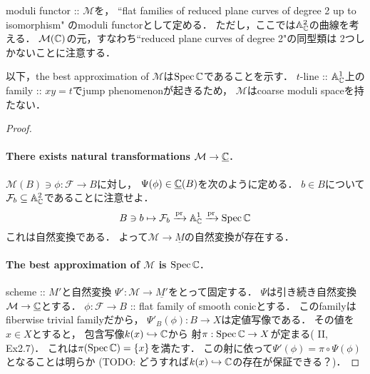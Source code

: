 \documentclass[a4paper]{jsarticle}
\newcommand{\famF}{\mathcal{F}}
\newcommand{\ftor}[1]{\underline{#1}}
\newcommand{\ftorM}{\mathcal{M}}
\begin{document}
    \begin{Example}
        moduli functor :: $\ftorM$を，
        ``flat families of reduced plane curves of degree 2 up to isomorphism"
        のmoduli functorとして定める．
        ただし，ここでは$\mathbb{A}_{\mathbb{C}}^2$の曲線を考える．
        $\ftorM(\C)$の元，すなわち``reduced plane curves of degree 2"の同型類は
        2つしかないことに注意する．

        以下，the best approximation of $\ftorM$は$\operatorname{Spec} \mathbb{C}$であることを示す．
        $t$-line :: $\mathbb{A}_{\mathbb{C}}^1$上のfamily :: $xy=t$でjump phenomenonが起きるため，
        $\ftorM$はcoarse moduli spaceを持たない．

        \begin{proof}
        \paragraph{There exists natural transformations $\ftorM \to \ftor{\C}$.}
        $\ftorM(B) \ni \phi: \famF \to B$に対し，
        $\Psi(\phi) \in \ftor{\C}(B)$を次のように定める．
        $b \in B$について$\famF_b \subseteq \affine^2_{\C}$であることに注意せよ．
        \[ B \ni b \mapsto \famF_b \xrightarrow{\pr} \affine^1_{\C} \xrightarrow{\pr} \Spec \C \]
        これは自然変換である．
        よって$\ftorM \to \ftor{M}$の自然変換が存在する．

        \paragraph{The best approximation of $\ftorM$ is $\operatorname{Spec} \mathbb{C}$.}
        scheme :: $M'$と自然変換
        $\Psi': \ftorM \to \ftor{M'}$をとって固定する．
        $\Psi$は引き続き自然変換$\ftorM \to \ftor{\C}$とする．
        $\phi: \famF \to B$ :: flat family of smooth conicとする．
        このfamilyはfiberwise trivial familyだから，
        $\Psi'_B(\phi): B \to X$は定値写像である．
        その値を$x \in X$とすると，
        包含写像$k(x) \hookrightarrow \mathbb{C}$から
        射$\pi: \operatorname{Spec} \mathbb{C} \to X$が定まる(\cite{HarAG} II, Ex2.7)．
        これは$\pi(\operatorname{Spec} \mathbb{C})=\{ x \}$を満たす．
        この射に依って$\Psi'(\phi)=\pi \circ \Psi(\phi)$となることは明らか
        (TODO: どうすれば$k(x) \hookrightarrow \mathbb{C}$の存在が保証できる？)．
        \end{proof}
    \end{Example}

\end{document}
